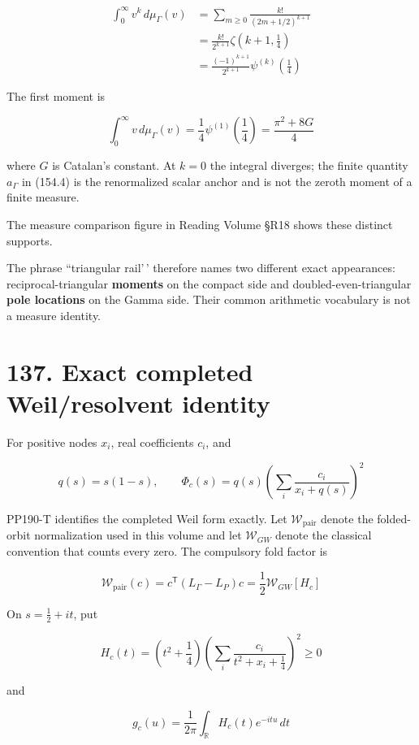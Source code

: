 \documentclass[
  11pt,
]{book}
\begin{document}
\[
\boxed{
\begin{aligned}
\int_0^\infty v^k\,d\mu_\Gamma(v)
&=\sum_{m\ge0}\frac{k!}{(2m+1/2)^{k+1}}\\
&=\frac{k!}{2^{k+1}}\zeta\!\left(k+1,\frac14\right)\\
&=\frac{(-1)^{k+1}}{2^{k+1}}
\psi^{(k)}\!\left(\frac14\right)
\end{aligned}}
\tag{158.1}
\]

The first moment is

\[
\int_0^\infty v\,d\mu_\Gamma(v)
=\frac14\psi^{(1)}\!\left(\frac14\right)
=\frac{\pi^2+8G}{4}
\tag{158.2}
\]

where \(G\) is Catalan's constant. At \(k=0\) the integral diverges; the
finite quantity \(a_\Gamma\) in (154.4) is the renormalized scalar
anchor and is not the zeroth moment of a finite measure.

The measure comparison figure in Reading Volume §R18 shows these
distinct supports.

The phrase ``triangular rail'\,' therefore names two different exact
appearances: reciprocal-triangular \textbf{moments} on the compact side
and doubled-even-triangular \textbf{pole locations} on the Gamma side.
Their common arithmetic vocabulary is not a measure identity.

\section{137. Exact completed Weil/resolvent
identity}\label{exact-completed-weilresolvent-identity}

For positive nodes \(x_i\), real coefficients \(c_i\), and

\[
q(s)=s(1-s),\qquad
\Phi_c(s)=q(s)\left(\sum_i\frac{c_i}{x_i+q(s)}\right)^2
\]

PP190-T identifies the completed Weil form exactly. Let
\(\mathcal W_{\mathrm{pair}}\) denote the folded-orbit normalization
used in this volume and let \(\mathcal W_{GW}\) denote the classical
convention that counts every zero. The compulsory fold factor is

\[
\boxed{
\mathcal W_{\mathrm{pair}}(c)
=c^{\mathsf T}(L_\Gamma-L_P)c
=\frac12\mathcal W_{GW}[H_c]}
\tag{137.1}
\]

On \(s=\tfrac12+it\), put

\[
H_c(t)=\left(t^2+\frac14\right)
\left(\sum_i\frac{c_i}{t^2+x_i+\frac14}\right)^2\ge0
\]

and

\[
g_c(u)=\frac1{2\pi}\int_{\mathbb R}H_c(t)e^{-itu}\,dt
\]
\end{document}
